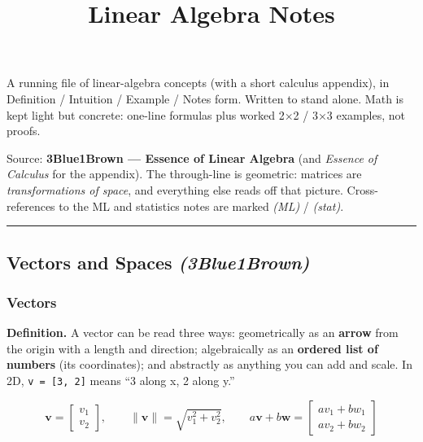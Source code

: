\documentclass[
  10pt,
  letterpaper,
  onecolumn]{article}
\title{Linear Algebra Notes}
\author{}
\date{}
\begin{document}
\maketitle

{
\hypersetup{linkcolor=black}
\setcounter{tocdepth}{2}
\tableofcontents
}
A running file of linear-algebra concepts (with a short calculus
appendix), in Definition / Intuition / Example / Notes form. Written to
stand alone. Math is kept light but concrete: one-line formulas plus
worked 2×2 / 3×3 examples, not proofs.

Source: \textbf{3Blue1Brown --- Essence of Linear Algebra} (and
\emph{Essence of Calculus} for the appendix). The through-line is
geometric: matrices are \emph{transformations of space}, and everything
else reads off that picture. Cross-references to the ML and statistics
notes are marked \emph{(ML)} / \emph{(stat)}.

\begin{center}\rule{0.5\linewidth}{0.5pt}\end{center}

\hypertarget{vectors-and-spaces-3blue1brown}{%
\subsection{\texorpdfstring{Vectors and Spaces
\emph{(3Blue1Brown)}}{Vectors and Spaces (3Blue1Brown)}}\label{vectors-and-spaces-3blue1brown}}

\hypertarget{vectors}{%
\subsubsection{Vectors}\label{vectors}}

\textbf{Definition.} A vector can be read three ways: geometrically as
an \textbf{arrow} from the origin with a length and direction;
algebraically as an \textbf{ordered list of numbers} (its coordinates);
and abstractly as anything you can add and scale. In 2D,
\texttt{v\ =\ {[}3,\ 2{]}} means ``3 along x, 2 along y.''

\begin{equation*}
\mathbf{v}=\begin{bmatrix}v_1\\v_2\end{bmatrix},
\qquad
\|\mathbf{v}\|=\sqrt{v_1^2+v_2^2},
\qquad
a\mathbf{v}+b\mathbf{w}=\begin{bmatrix}av_1+bw_1\\av_2+bw_2\end{bmatrix}
\end{equation*}
\end{document}
